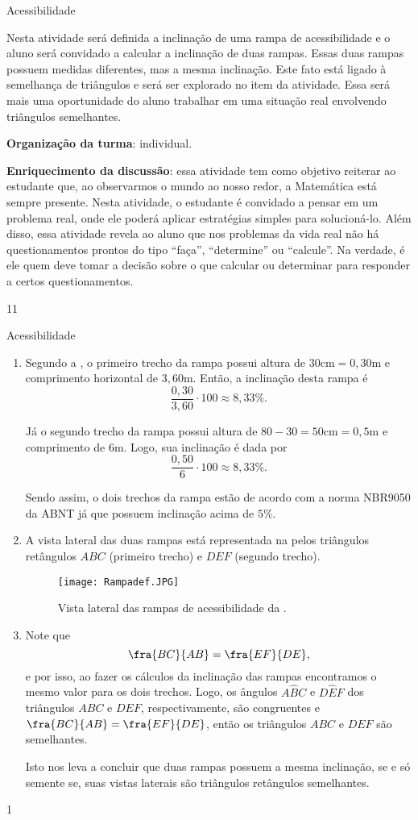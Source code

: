 \clearmargin
\begin{sugestions}{Acessibilidade}
{
Nesta atividade será definida a inclinação de uma rampa de acessibilidade e o aluno será convidado a calcular a inclinação de duas rampas. Essas duas rampas possuem medidas diferentes, mas a mesma inclinação. Este fato está ligado à semelhança de triângulos e será ser explorado no item  da atividade. Essa será mais uma oportunidade do aluno trabalhar em uma situação real envolvendo triângulos semelhantes.

\textbf{Organização da turma}: individual.

\textbf{Enriquecimento da discussão}: essa atividade tem como objetivo reiterar ao estudante que, ao observarmos o mundo ao nosso redor, a Matemática está sempre presente. Nesta atividade, o estudante é convidado a pensar em um problema real, onde ele poderá aplicar estratégias simples para solucioná-lo. Além disso, essa atividade revela ao aluno que nos problemas da vida real não há questionamentos prontos do tipo ``faça'', ``determine'' ou ``calcule''. Na verdade, é ele quem deve tomar a decisão sobre o que calcular ou determinar para responder a certos questionamentos.
}{1}{1}
\end{sugestions}
\clearmargin
\begin{answer}{Acessibilidade}
{
\begin{enumerate}


\item{}
Segundo a , o primeiro trecho da rampa possui altura de $30\text{cm}=0,30$m e comprimento horizontal de $3,60$m. Então, a inclinação desta rampa é 
$$\frac{0{,}30}{3{,}60}\cdot 100\approx 8{,}33\%.$$

Já o segundo trecho da rampa possui altura de $80-30=50\text{cm}=0,5$m e comprimento de $6$m. Logo, sua inclinação é dada por 
$$\frac{0{,}50}{6}\cdot 100\approx 8{,}33\%.$$

Sendo assim, o dois trechos da rampa estão de acordo com a norma NBR9050 da ABNT já que possuem inclinação acima de $5\%$.

\item{}
A vista lateral das duas rampas está representada na   pelos triângulos retângulos $ABC$ (primeiro trecho) e $DEF$ (segundo trecho).
\begin{figure}[H]
    \centering
    \texttt{[image: Rampadef.JPG]}
    \caption{Vista lateral das rampas de acessibilidade da  .}
    \label{Rampadef}
\end{figure}

\item{}
Note que 
$$\fra{BC}{AB}=\fra{EF}{DE},$$
e por isso, ao fazer os cálculos da inclinação das rampas encontramos o mesmo valor para os dois trechos. 
Logo, os ângulos $A\hat{B}C$ e $D\hat{E}F$ dos triângulos $ABC$ e $DEF$, respectivamente, são congruentes e $\fra{BC}{AB}=\fra{EF}{DE}$, então os triângulos $ABC$ e $DEF$ são semelhantes.

Isto nos leva a concluir que duas rampas possuem a mesma inclinação, se e só semente se, suas vistas laterais são triângulos retângulos semelhantes. 
\end{enumerate}
}{1}
\end{answer}

